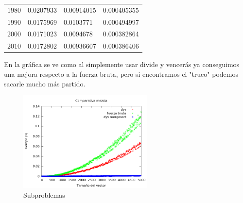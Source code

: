 \begin{center}
\begin{longtable}{l|l|l|l}
1980                                                   & 0.0207933                                                         & 0.00914015                                               & 0.000405355                                                        \\
1990                                                   & 0.0175969                                                         & 0.0103771                                                & 0.000494997                                                        \\
2000                                                   & 0.0171023                                                         & 0.0094678                                                & 0.000382864                                                        \\
2010                                                   & 0.0172802                                                         & 0.00936607                                               & 0.000386406                                                       
\end{longtable}
\end{center}

En la gráfica se ve como al simplemente usar divide y vencerás ya conseguimos una mejora respecto a la fuerza bruta, pero si encontramos el "truco" podemos sacarle mucho más partido.

\begin{figure}[htb] 
\centering
	\includegraphics[width=0.6\textwidth]{../Opcional/Graficas/comparativa.png}
	\caption{Subproblemas} 
	\label{fig:perros} 
\end{figure}

